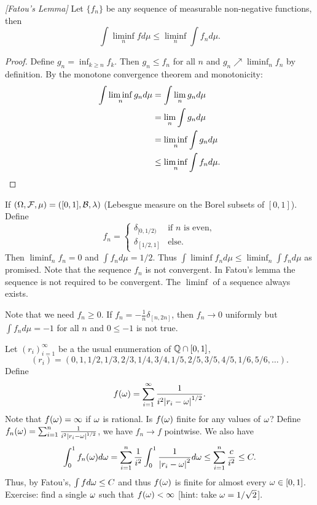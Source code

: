 \begin{lemma}
    \emph{[Fatou's Lemma]} Let $\{f_n\}$ be any sequence of measurable non-negative functions, then 
    \[\int \liminf_n f d\mu \le \liminf_n \int f_nd\mu.  \]
\end{lemma}
\begin{proof}
    Define $g_n = \inf_{k \ge n} f_k$. Then $g_n \le f_n$ for all $n$ and $g_n \nearrow \liminf_n f_n$ by definition. By the monotone convergence theorem and monotonicity:
    \begin{align*}
        \int \liminf_n g_n d\mu &= \int \lim_n g_n d\mu\\
        &=\lim_n\int g_n d\mu\\
        &=\liminf_n \int g_n d\mu \\
        &\le \liminf_n \int f_n d\mu. \qedhere
    \end{align*} 
\end{proof}
\begin{ex}
If $({{\Omega}},{\mathcal{F}},\mu) = ([0,1], {\mathcal{B}},\lambda)$ (Lebesgue measure on the Borel subsets of $[0,1]$). Define 
\[f_n = \begin{cases}
    \delta_{[0,1/2)} &\text{if $n$ is even},\\
    \delta_{[1/2,1]} &\text{else}.
\end{cases} \]
Then $\liminf_n f_n =0$ and $\int f_n d\mu = 1/2$. Thus $\int \liminf f_n d\mu \le \liminf_n \int f_nd\mu$ as promised. Note that the sequence $f_n$ is not convergent. In Fatou's lemma the sequence is not required to be convergent. The $\liminf$ of a sequence always exists.
\end{ex}
\begin{ex}
    Note that we need $f_n \ge 0$. If $f_n = -\frac{1}{n}\delta_{[n,2n]}$, then $f_n \to 0$ uniformly but $\int f_nd\mu = -1$ for all $n$ and $0 \le -1$ is not true.
\end{ex}
\begin{ex}
    Let $(r_i)_{i=1}^\infty$  be a the usual enumeration of ${\mathbb{Q}} \cap [0,1]$,
    \[(r_i) = (0,1,1/2,1/3,2/3,1/4,3/4,1/5,2/5,3/5,4/5,1/6,5/6,\ldots). \]
    Define 
    \[f({\omega}) = \sum_{i=1}^\infty \frac{1}{i^2{\left\lvert r_i-{\omega}\right\rvert}^{1/2}}. \]
    Note that $f({\omega}) = \infty$ if ${\omega}$ is rational. Is $f({\omega})$ finite for any values of ${\omega}$? Define $f_n({\omega}) = \sum_{i=1}^n \frac{1}{i^2{\left\lvert r_i-{\omega}\right\rvert}^{1/2}}$, we have $f_n \to f$ pointwise. We also have 
    \[\int_0^1 f_n({\omega})d{\omega} = \sum_{i=1}^n \frac{1}{i^2} \int_0^1\frac{1}{{\left\lvert r_i-{\omega}\right\rvert}^2}d{\omega} \le \sum_{i=1}^n \frac{c}{i^2} \le C. \]
    Thus, by Fatou's, $\int f d{\omega} \le C$ and thus $f({\omega})$ is finite for almost every ${\omega} \in [0,1]$. Exercise: find a single ${\omega}$ such that $f({\omega}) < \infty$ [hint: take ${\omega} = 1/\sqrt{2}$].
\end{ex}
